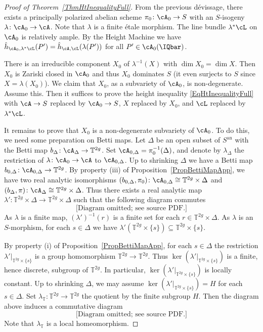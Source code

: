 \begin{proof}[Proof of Theorem~\ref{ThmHtInequalityFull}]
From the previous d\'{e}vissage, there exists a principally polarized abelian scheme $\pi_0 \colon \cA_0 \rightarrow S$ with an $S$-isogeny $\lambda \colon \cA_0 \rightarrow \cA$. Note that $\lambda$ is a finite \'{e}tale morphism. The line bundle $\lambda^*\cL$ on $\cA_0$ is relatively ample. By the Height Machine we have $\hat{h}_{\cA_0,\lambda^*\cL}(P') = \hat{h}_{\cA,\cL}(\lambda(P'))$ for all $P' \in \cA_0(\IQbar)$.

There is  an irreducible component $X_0$ of $\lambda^{-1}(X)$ with
$\dim X_0 = \dim X$. Then $X_0$ is Zariski closed in $\cA_0$ and thus $X_0$ dominates $S$ (it even surjects to $S$
since $X = \lambda(X_0)$). We
claim that $X_0$, as a subvariety of $\cA_0$, is non-degenerate. Assume this. Then it suffices to prove the height inequality \eqref{EqHtInequalityFull} with $\cA \rightarrow S$ replaced by $\cA_0 \rightarrow S$, $X$ replaced by $X_0$, and $\cL$ replaced by $\lambda^*\cL$.

It remains to prove that $X_0$ is a non-degenerate subvariety of $\cA_0$. To do this, we need some preparation on Betti maps. Let $\Delta$ be an open subset of $S^{\mathrm{an}}$ with the Betti map $b_{\Delta} \colon \cA_{\Delta} \rightarrow \mathbb{T}^{2g}$. Set $\cA_{0,\Delta} = \pi_0^{-1}(\Delta)$, and denote by $\lambda_{\Delta}$ the restriction of $\lambda \colon \cA_0 \rightarrow \cA$ to $\cA_{0,\Delta}$. Up to shrinking $\Delta$ we have a Betti map $b_{0,\Delta} \colon \cA_{0,\Delta} \rightarrow \mathbb{T}^{2g}$. By property (iii) of Proposition~\ref{PropBettiMapApp}, we have two real analytic isomorphisms $(b_{0,\Delta},\pi_0) \colon \cA_{0,\Delta} \cong \mathbb{T}^{2g} \times \Delta$ and $(b_{\Delta},\pi) \colon \cA_{\Delta} \cong \mathbb{T}^{2g} \times \Delta$. Thus there exists a real analytic map $\lambda' \colon \mathbb{T}^{2g} \times \Delta \rightarrow \mathbb{T}^{2g} \times \Delta$ such that the following diagram commutes
\[
\text{[Diagram omitted; see source PDF.]}
\]
As $\lambda$ is a finite map, $(\lambda')^{-1}(r)$ is a finite set for each $r \in \mathbb{T}^{2g} \times\Delta$. As $\lambda$ is an $S$-morphism, for each $s \in \Delta$ we have $\lambda'({\mathbb{T}^{2g} \times \{s\}}) \subseteq \mathbb{T}^{2g} \times \{s\}$.

By property (i) of Proposition~\ref{PropBettiMapApp}, for each $s \in \Delta$ the restriction $\lambda'|_{\mathbb{T}^{2g} \times \{s\}}$ is a group homomorphism $\mathbb{T}^{2g}  \rightarrow  \mathbb{T}^{2g}$. Thus $\ker(\lambda'|_{\mathbb{T}^{2g} \times \{s\}})$ is a finite, hence discrete, subgroup of $\mathbb{T}^{2g}$. In particular, $\ker(\lambda'|_{\mathbb{T}^{2g} \times \{s\}})$ is locally constant. Up to shrinking $\Delta$, we may assume $\ker(\lambda'|_{\mathbb{T}^{2g} \times \{s\}}) = H$ for each $s \in \Delta$. Set $\lambda_{\mathbb{T}} \colon \mathbb{T}^{2g} \rightarrow \mathbb{T}^{2g}$ the quotient by the finite subgroup $H$.
Then the diagram above induces a commutative diagram
\begin{equation}
\text{[Diagram omitted; see source PDF.]}
\end{equation}
Note that $\lambda_{\mathbb{T}}$ is a local homeomorphism.



\end{proof}
